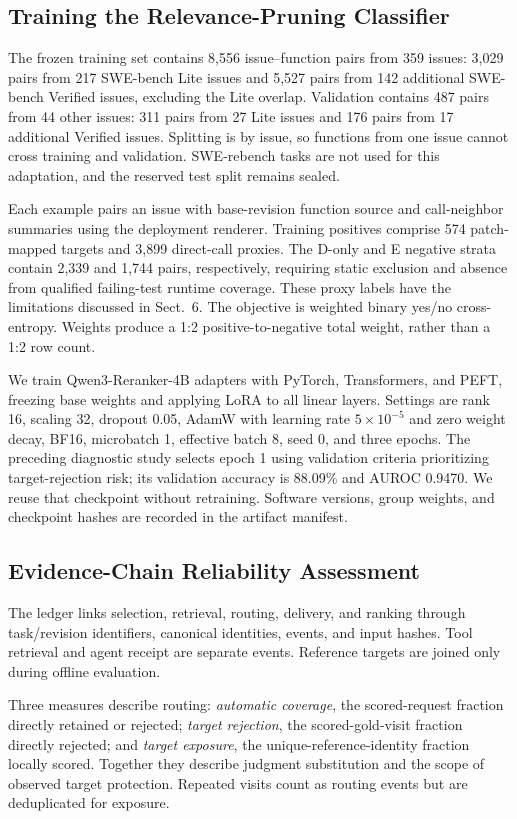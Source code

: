\documentclass{svproc}
\begin{document}
\subsection{Training the Relevance-Pruning Classifier}
The frozen training set contains 8,556 issue--function pairs from 359 issues: 3,029 pairs from 217 SWE-bench Lite issues and 5,527 pairs from 142 additional SWE-bench Verified issues, excluding the Lite overlap. Validation contains 487 pairs from 44 other issues: 311 pairs from 27 Lite issues and 176 pairs from 17 additional Verified issues. Splitting is by issue, so functions from one issue cannot cross training and validation. SWE-rebench tasks are not used for this adaptation, and the reserved test split remains sealed.

Each example pairs an issue with base-revision function source and call-neighbor summaries using the deployment renderer. Training positives comprise 574 patch-mapped targets and 3,899 direct-call proxies. The D-only and E negative strata contain 2,339 and 1,744 pairs, respectively, requiring static exclusion and absence from qualified failing-test runtime coverage. These proxy labels have the limitations discussed in Sect.~6. The objective is weighted binary yes/no cross-entropy. Weights produce a 1:2 positive-to-negative total weight, rather than a 1:2 row count.

We train Qwen3-Reranker-4B adapters with PyTorch, Transformers, and PEFT, freezing base weights and applying LoRA to all linear layers. Settings are rank 16, scaling 32, dropout 0.05, AdamW with learning rate $5\!\times\!10^{-5}$ and zero weight decay, BF16, microbatch 1, effective batch 8, seed 0, and three epochs. The preceding diagnostic study selects epoch 1 using validation criteria prioritizing target-rejection risk; its validation accuracy is 88.09\% and AUROC 0.9470. We reuse that checkpoint without retraining. Software versions, group weights, and checkpoint hashes are recorded in the artifact manifest.

\subsection{Evidence-Chain Reliability Assessment}
The ledger links selection, retrieval, routing, delivery, and ranking through task/revision identifiers, canonical identities, events, and input hashes. Tool retrieval and agent receipt are separate events. Reference targets are joined only during offline evaluation.

Three measures describe routing: \emph{automatic coverage}, the scored-request fraction directly retained or rejected; \emph{target rejection}, the scored-gold-visit fraction directly rejected; and \emph{target exposure}, the unique-reference-identity fraction locally scored. Together they describe judgment substitution and the scope of observed target protection. Repeated visits count as routing events but are deduplicated for exposure.
\end{document}
